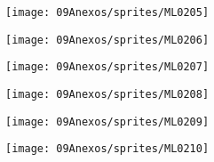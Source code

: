 \begin{center}
\texttt{[image: 09Anexos/sprites/ML0205]}
\end{center}

\begin{center}
\texttt{[image: 09Anexos/sprites/ML0206]}
\end{center}

\begin{center}
\texttt{[image: 09Anexos/sprites/ML0207]}
\end{center}

\begin{center}
\texttt{[image: 09Anexos/sprites/ML0208]}
\end{center}

\begin{center}
\texttt{[image: 09Anexos/sprites/ML0209]}
\end{center}

\begin{center}
\texttt{[image: 09Anexos/sprites/ML0210]}
\end{center}